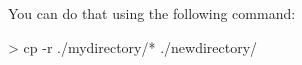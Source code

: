 You can do that using the following command:
\begin{cmdblock}
> cp -r ./mydirectory/* ./newdirectory/
\end{cmdblock}
